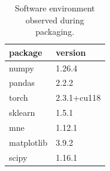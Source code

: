 \begin{table}
\caption{Software environment observed during packaging.}
\label{tab:software_environment_table}
\begin{tabular}{ll}
\toprule
package & version \\
\midrule
numpy & 1.26.4 \\
pandas & 2.2.2 \\
torch & 2.3.1+cu118 \\
sklearn & 1.5.1 \\
mne & 1.12.1 \\
matplotlib & 3.9.2 \\
scipy & 1.16.1 \\
\bottomrule
\end{tabular}
\end{table}

